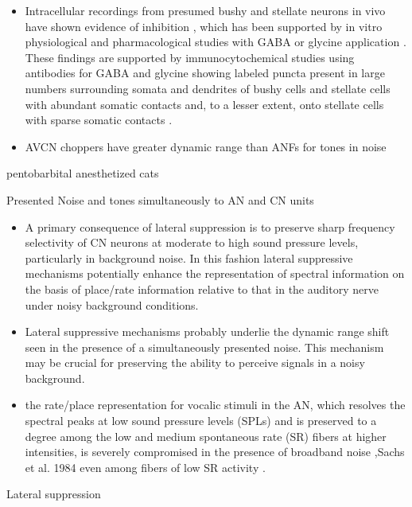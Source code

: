\documentclass[10pt,a4paper]{article}
\begin{document}
\begin{itemize}
\item Intracellular recordings from presumed bushy and stellate neurons in vivo
  have shown evidence of inhibition \citep{RhodeSmith:1986,SmithRhode:1989},
  which has been supported by in vitro physiological and pharmacological studies
  with GABA or glycine application \citep{WuOertel:1986} . These findings are
  supported by immunocytochemical studies using antibodies for GABA and glycine
  showing labeled puncta present in large numbers surrounding somata and
  dendrites of bushy cells and stellate cells with abundant somatic contacts
  and, to a lesser extent, onto stellate cells with sparse somatic contacts
  \citep{AltschulerBetzEtAl:,SaintOstapoffEtAl:1993,SaintBensonEtAl:1991,SaintMorestEtAl:1989,WentholdHuieEtAl:1987,FexAltschulerEtAl:1986,WentholdZempelEtAl:1986,1986}.
\item AVCN choppers have greater dynamic range than ANFs for tones in noise
  \citep{MaySachs:1998,MaySachs:1992,PalmerEvans:1982,GeislerSilkes:1991,RhodeGeislerEtAl:1978,RhodeSmith:1986,YoungCostalupesEtAl:1983,YoungShofnerEtAl:1988,YoungRobertEtAl:1988}
\end{itemize}
\citep{RhodeGreenberg:1994b} pentobarbital anesthetized cats

Presented Noise and tones simultaneously to AN and CN units


\begin{itemize}
\item A primary consequence of lateral suppression is to preserve sharp
  frequency selectivity of CN neurons at moderate to high sound pressure levels,
  particularly in background noise. In this fashion lateral suppressive
  mechanisms potentially enhance the representation of spectral information on
  the basis of place/rate information relative to that in the auditory nerve
  under noisy background conditions.
\item Lateral suppressive mechanisms probably underlie the dynamic range shift
  seen in the presence of a simultaneously presented noise. This mechanism may
  be crucial for preserving the ability to perceive signals in a noisy
  background.
\item the rate/place representation for vocalic stimuli in the AN, which
  resolves the spectral peaks at low sound pressure levels (SPLs) and is
  preserved to a degree among the low and medium spontaneous rate (SR) fibers at
  higher intensities, is severely compromised in the presence of broadband noise
  \citep{GeislerGamble:1989} ,Sachs et al. 1984 even among fibers of low SR
  activity \citep{SachsVoigtEtAl:1983,MillerSachs:1984,SilkesGeisler:1991}.
\end{itemize}
Lateral suppression
\end{document}

